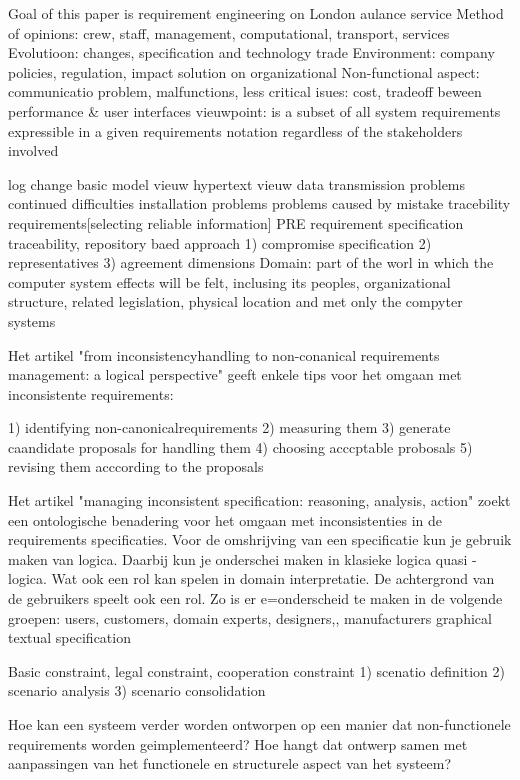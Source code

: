  Goal of this paper is requirement  engineering on London aulance service
 Method of opinions: crew, staff, management, computational, transport, services
 Evolutioon: changes, specification and technology trade
 Environment: company policies, regulation, impact solution on organizational
 Non-functional aspect: communicatio problem, malfunctions, less critical isues: cost, tradeoff beween performance \& user interfaces
 vieuwpoint: is a subset of all system requirements expressible in a given requirements notation regardless of the stakeholders involved
 
 log change
 basic model vieuw
 hypertext vieuw
 data transmission problems
 continued difficulties
 installation problems
 problems caused by mistake
 tracebility requirements[selecting reliable information]
 PRE requirement specification traceability, repository baed approach
 1) compromise specification
 2) representatives
 3) agreement dimensions
 Domain: part of the worl in which the computer system effects will be felt, inclusing its peoples, organizational structure, related legislation, physical location and met only the compyter systems
 
 
 Het artikel "from inconsistencyhandling to non-conanical requirements management: a logical perspective" geeft enkele tips voor het omgaan met inconsistente requirements:
 
 1) identifying non-canonicalrequirements
 2) measuring them
 3) generate caandidate proposals for handling them
 4) choosing acccptable probosals
 5) revising them acccording to the proposals

Het artikel "managing inconsistent specification: reasoning, analysis, action" zoekt een ontologische benadering voor het omgaan met inconsistenties in de requirements specificaties.
Voor de omshrijving van een specificatie kun je gebruik maken van logica. Daarbij kun je onderschei maken in klasieke logica quasi -logica.
Wat ook een rol kan spelen in domain interpretatie. De achtergrond van de gebruikers speelt ook een rol.
Zo is er e=onderscheid te maken in de volgende groepen: users, customers, domain experts, designers,, manufacturers
graphical  textual specification

Basic constraint, legal constraint, cooperation constraint
1) scenatio  definition
2) scenario analysis
3) scenario consolidation


Hoe kan een systeem verder worden ontworpen op een manier dat non-functionele requirements worden geimplementeerd?
Hoe hangt dat ontwerp samen met aanpassingen van het functionele en structurele aspect van het systeem?

